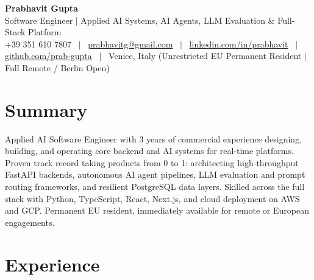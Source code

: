 \documentclass[a4paper,10pt]{article}
\begin{document}
\begin{minipage}[c]{0.80\textwidth}
  {\Huge\bfseries Prabhavit Gupta}\\[3pt]
  {\color{accent}\large Software Engineer $\vert$ Applied AI Systems, AI Agents, LLM Evaluation \& Full-Stack Platform}\\[6pt]
  {\footnotesize +39 351 610 7807 ~$\vert$~
  \href{mailto:prabhavitg@gmail.com}{prabhavitg@gmail.com} ~$\vert$~
  \href{https://www.linkedin.com/in/prabhavit/}{linkedin.com/in/prabhavit} ~$\vert$~
  \href{https://github.com/prab-gupta}{github.com/prab-gupta} ~$\vert$~
  Venice, Italy (Unrestricted EU Permanent Resident $\vert$ Full Remote / Berlin Open)}
\end{minipage}\hfill

\section{Summary}
Applied AI Software Engineer with 3 years of commercial experience designing, building, and operating core backend and AI systems for real-time platforms. Proven track record taking products from 0 to 1: architecting high-throughput FastAPI backends, autonomous AI agent pipelines, LLM evaluation and prompt routing frameworks, and resilient PostgreSQL data layers. Skilled across the full stack with Python, TypeScript, React, Next.js, and cloud deployment on AWS and GCP. Permanent EU resident, immediately available for remote or European engagements.

\section{Experience}
\end{document}
